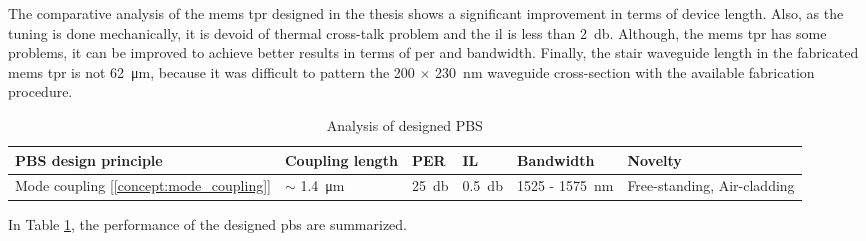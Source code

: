 \documentclass[../report.tex]{subfiles}
\begin{document}
The comparative analysis of the \gls{mems} \gls{tpr} designed in the thesis shows a significant improvement in terms of device length. Also, as the tuning is done mechanically, it is devoid of thermal cross-talk problem and the \gls{il} is less than \SI{2}{\decibel}. Although, the \gls{mems} \gls{tpr} has some problems, it can be improved to achieve better results in terms of \gls{per} and bandwidth. Finally, the stair waveguide length in the fabricated \gls{mems} \gls{tpr} is not \SI{62}{\micro \meter}, because it was difficult to pattern the 200 $\times$ \SI{230}{\nano \meter} waveguide cross-section with the available fabrication procedure. 

\begin {table}[H]
\begin{center} 
	\begin{tabular}{ | m{7em} | m{1.9cm}| m{1.3cm} | m{1.3cm} | m{7em} | m{7em} | }  
		\hline
		\textbf{PBS design principle} & \textbf{Coupling length} & \textbf{PER} & \textbf{IL} & \textbf{Bandwidth} & \textbf{Novelty}\\ [1.5ex]
		\hline\hline
		Mode coupling [\ref{concept:mode_coupling}] & $\sim$ \SI{1.4}{\micro \meter} & \SI{25}{\decibel} & \SI{0.5}{\decibel} & 1525 - \SI{1575}{\nano \meter} & Free-standing, Air-cladding \\ 
		\hline	
	\end{tabular}
\end{center}
\caption {Analysis of designed PBS} 
\label{table:pbs_summary} 
\end {table}
In Table \ref{table:pbs_summary}, the performance of the designed \gls{pbs} are summarized.
\end{document}
